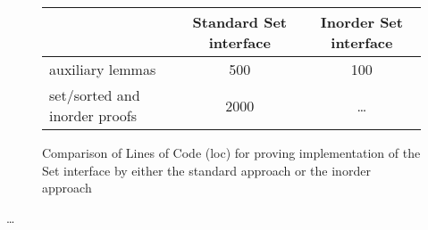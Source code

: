 \begin{figure}
    \begin{tabular}{l|c|c}
        \                & Standard Set interface & Inorder Set interface \\
        \hline
        auxiliary lemmas & 500                    & 100                   \\
        set/sorted and inorder proofs & 2000      & \dots                 \\
    \end{tabular}
    \caption{Comparison of Lines of Code (loc) for proving implementation
    of the Set interface by either the standard approach or the inorder approach}
    \label{fig:proof-standard-inorder}
\end{figure}

\dots
